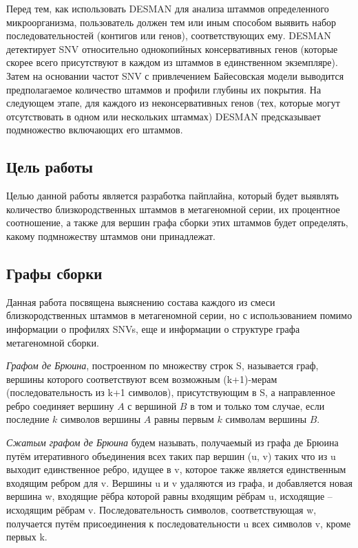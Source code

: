 \documentclass{spbau-diploma}
\begin{document}
 
Перед тем, как использовать DESMAN для анализа штаммов определенного микроорганизма, пользователь должен тем или иным способом выявить набор последовательностей (контигов или генов), соответствующих ему.
DESMAN детектирует SNV относительно однокопийных консервативных генов (которые скорее всего присутствуют в каждом из штаммов в единственном экземпляре). Затем на основании частот SNV с привлечением Байесовская модели выводится предполагаемое количество штаммов и профили глубины их покрытия. 
На следующем этапе, для каждого из неконсервативных генов (тех, которые могут отсутствовать в одном или нескольких штаммах) DESMAN предсказывает подмножество включающих его штаммов.

\subsection{Цель работы}
Целью данной работы является разработка пайплайна, который будет выявлять количество близкородственных штаммов в метагеномной серии, их процентное соотношение, а также для вершин графа сборки этих штаммов будет определять, какому подмножеству штаммов они принадлежат.

\subsection{Графы сборки}
Данная работа посвящена выяснению состава каждого из смеси близкородственных штаммов в метагеномной серии, но с использованием помимо информации о профилях SNVs, еще и информации о структуре графа метагеномной сборки. 

\textit{Графом де Брюина}, построенном по множеству строк S, называется граф, вершины которого соответствуют всем возможным (k+1)-мерам (последовательность из k+1 символов), присутствующим в S, а направленное ребро соединяет вершину $A$ с вершиной $B$ в том и только том случае, если последние $k$ символов вершины $A$ равны первым $k$ символам вершины $B$.

\textit{Сжатым графом де Брюина} будем называть, получаемый из графа де Брюина путём итеративного объединения всех таких пар вершин (u, v) таких что из u выходит единственное ребро, идущее в v, которое также является единственным входящим ребром для v. Вершины u и v удаляются из графа, и добавляется новая вершина w, входящие рёбра которой равны входящим рёбрам u, исходящие -- исходящим рёбрам v. Последовательность символов, соответствующая w, получается путём присоединения к последовательности u всех символов v, кроме первых k.
\end{document}
